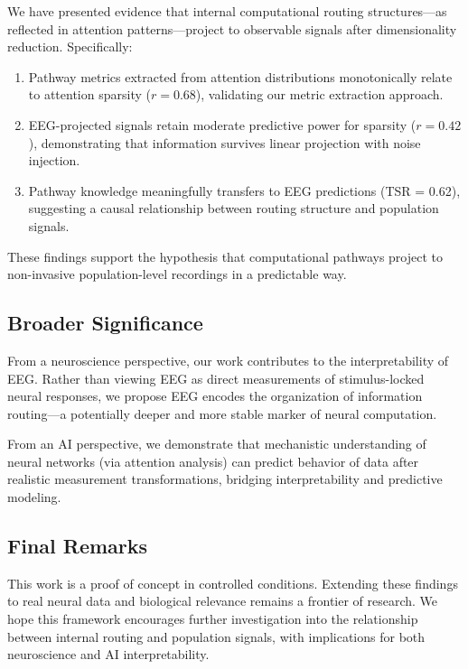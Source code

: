 We have presented evidence that internal computational routing structures—as reflected in attention patterns—project to observable signals after dimensionality reduction. Specifically:

\begin{enumerate}
    \item Pathway metrics extracted from attention distributions monotonically relate to attention sparsity ($r = 0.68$), validating our metric extraction approach.
    
    \item EEG-projected signals retain moderate predictive power for sparsity ($r = 0.42$), demonstrating that information survives linear projection with noise injection.
    
    \item Pathway knowledge meaningfully transfers to EEG predictions (TSR = 0.62), suggesting a causal relationship between routing structure and population signals.
\end{enumerate}

These findings support the hypothesis that computational pathways project to non-invasive population-level recordings in a predictable way.

\subsection{Broader Significance}

From a neuroscience perspective, our work contributes to the interpretability of EEG. Rather than viewing EEG as direct measurements of stimulus-locked neural responses, we propose EEG encodes the organization of information routing—a potentially deeper and more stable marker of neural computation.

From an AI perspective, we demonstrate that mechanistic understanding of neural networks (via attention analysis) can predict behavior of data after realistic measurement transformations, bridging interpretability and predictive modeling.

\subsection{Final Remarks}

This work is a proof of concept in controlled conditions. Extending these findings to real neural data and biological relevance remains a frontier of research. We hope this framework encourages further investigation into the relationship between internal routing and population signals, with implications for both neuroscience and AI interpretability.
